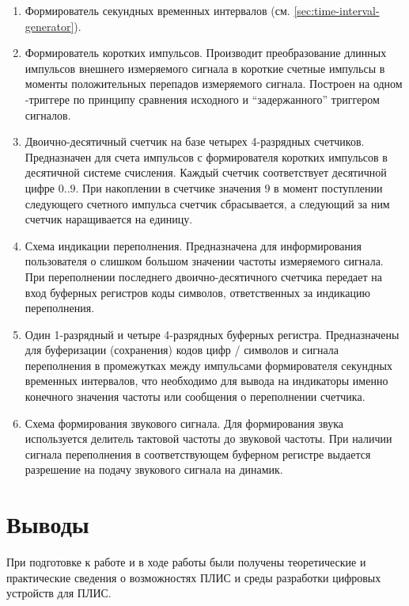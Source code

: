 \begin{enumerate}[label=\asbuk*)]

\item Формирователь секундных временных интервалов (см. \autoref{sec:time-interval-generator}).

\item Формирователь коротких импульсов. Производит преобразование длинных импульсов внешнего измеряемого сигнала в короткие счетные импульсы в моменты положительных перепадов измеряемого сигнала. Построен на одном -триггере по принципу сравнения исходного и \enquote{задержанного} триггером сигналов.

\item Двоично-десятичный счетчик на базе четырех 4-разрядных счетчиков. Предназначен для счета импульсов с формирователя коротких импульсов в десятичной системе счисления. Каждый счетчик соответствует десятичной цифре $0..9$. При накоплении в счетчике значения $9$ в момент поступлении следующего счетного импульса счетчик сбрасывается, а следующий за ним счетчик наращивается на единицу.

\item Схема индикации переполнения. Предназначена для информирования пользователя о слишком большом значении частоты измеряемого сигнала. При переполнении последнего двоично-десятичного счетчика передает на вход буферных регистров коды символов, ответственных за индикацию переполнения.

\item Один 1-разрядный и четыре 4-разрядных буферных регистра. Предназначены для буферизации (сохранения) кодов цифр / символов и сигнала переполнения в промежутках между импульсами формирователя секундных временных интервалов, что необходимо для вывода на индикаторы именно конечного значения частоты или сообщения о переполнении счетчика.

\item Схема формирования звукового сигнала. Для формирования звука используется делитель тактовой частоты до звуковой частоты. При наличии сигнала переполнения в соответствующем буферном регистре выдается разрешение на подачу звукового сигнала на динамик.

\end{enumerate}

\section{Выводы}

При подготовке к работе и в ходе работы были получены теоретические и практические сведения о возможностях ПЛИС и среды разработки цифровых устройств для ПЛИС.

